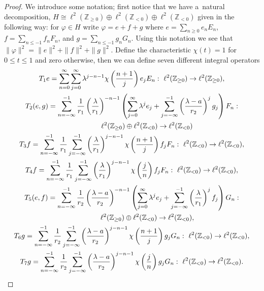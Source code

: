 \documentclass[pdftex]{sigma}
\numberwithin{equation}{section}
\begin{document}
\begin{proof}
We introduce some notation; f\/irst notice that we have a~natural decomposition, $H \!\cong\! \ell^2({\mathbb Z}_{\ge0})
\oplus \ell^2({\mathbb Z}_{<0}) \oplus \ell^2({\mathbb Z}_{<0})$ given in the following way: for $\varphi\in H$ write
$\varphi=e+f+g$ where $e=\sum\limits_{n\ge0}e_nE_n$, $f= \sum\limits_{n\le-1}f_nF_n$, and $g=\sum\limits_{n\le-1}g_nG_n$.
Using this notation we see that $\|\varphi\|^2=\|e\|^2+\|f\|^2+\|g\|^2$.
Def\/ine the characteristic $\chi(t)=1$ for $0\le t\le1$ and zero otherwise, then we can def\/ine seven dif\/ferent integral operators
\begin{gather}
T_1e=\sum\limits_{n=0}^\infty\sum\limits_{j=0}^\infty \lambda^{j-n-1}\chi\left(\frac{n+1}{j}\right)e_jE_n: \
\ell^2({\mathbb Z}_{\ge0})\to\ell^2({\mathbb Z}_{\ge0}),
\nonumber
\\
T_2(e,g)=\sum\limits_{n=-\infty}^{-1}\frac{1}{r_1}\left(\frac{\lambda}{r_1}\right)^{-n-1}\left(\sum\limits_{j=0}^\infty\lambda^je_j
+ \sum\limits_{j=-\infty}^{-1}\left(\frac{\lambda-a}{r_2}\right)^jg_j\right)F_n :
\nonumber
\\
\hphantom{T_2(e,g)=}{} \ell^2({\mathbb Z}_{\ge0})\oplus\ell^2({\mathbb Z}_{<0})\to\ell^2({\mathbb Z}_{<0})
\nonumber
\\
T_3f =
\sum\limits_{n=-\infty}^{-1}\frac{1}{r_1}\sum\limits_{j=-\infty}^{-1}\left(\frac{\lambda}{r_1}\right)^{j-n-1}\chi\left(\frac{n+1}{j}\right)f_jF_n: \
\ell^2({\mathbb Z}_{<0})\to\ell^2({\mathbb Z}_{<0}),
\nonumber
\\
\label{int_ops_resolvent_z}
T_4f =
\sum\limits_{n=-\infty}^{-1}\frac{1}{r_1}\sum\limits_{j=-\infty}^{-1}\left(\frac{\lambda}{r_1}\right)^{j-n-1}\chi\left(\frac{j}{n}\right)f_jF_n: \
\ell^2({\mathbb Z}_{<0})\to\ell^2({\mathbb Z}_{<0}),
\\
T_5(e,f) =\sum\limits_{n=-\infty}^{-1}\frac{1}{r_2}\left(\frac{\lambda-a}{r_2}\right)^{-n-1}
\left(\sum\limits_{j=0}^\infty\lambda^je_j+\sum\limits_{j=-\infty}^{-1}\left(\frac{\lambda}{r_1}\right)^jf_j\right)G_n:
\nonumber
\\
\hphantom{T_5(e,f) =}{} \ell^2({\mathbb Z}_{\ge0})\oplus\ell^2({\mathbb Z}_{<0})\to\ell^2({\mathbb Z}_{<0}),
\nonumber
\\
T_6g=\sum\limits_{n=-\infty}^{-1}\frac{1}{r_2}\sum\limits_{j=-\infty}^{-1}\left(\frac{\lambda-a}{r_2}\right)^{j-n-1}
\chi\left(\frac{n+1}{j}\right)g_j G_n: \ \ell^2({\mathbb Z}_{<0})\to\ell^2({\mathbb Z}_{<0}),
\nonumber
\\
T_7g=\sum\limits_{n=-\infty}^{-1}\frac{1}{r_2}\sum\limits_{j=-\infty}^{-1}\left(\frac{\lambda-a}{r_2}\right)^{j-n-1}
\chi\left(\frac{j}{n}\right)g_j G_n: \  \ell^2({\mathbb Z}_{<0})\to\ell^2({\mathbb Z}_{<0}).
\nonumber
\end{gather}


\end{proof}
\end{document}
